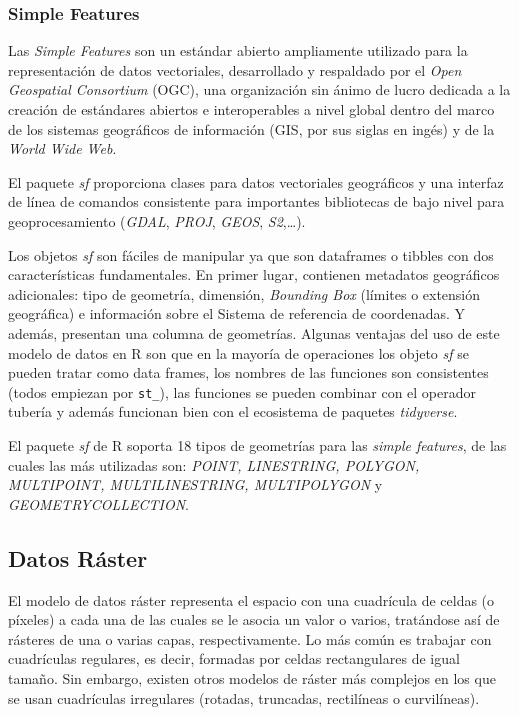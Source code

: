 \documentclass[12pt,a4paper,]{book}
\numberwithin{dummy}{section}
\theoremstyle{ocrenumbox}
\theoremstyle{blacknumex}
\theoremstyle{blacknumbox}
\theoremstyle{ocrenum}
\theoremstyle{ocrenum}
\begin{document}
\hypertarget{simple-features}{%
\subsubsection*{Simple Features}\label{simple-features}}

Las \emph{Simple Features} son un estándar abierto ampliamente utilizado
para la representación de datos vectoriales, desarrollado y respaldado
por el \emph{Open Geospatial Consortium} (OGC), una organización sin
ánimo de lucro dedicada a la creación de estándares abiertos e
interoperables a nivel global dentro del marco de los sistemas
geográficos de información (GIS, por sus siglas en ingés) y de la
\emph{World Wide Web}.

El paquete \emph{sf} proporciona clases para datos vectoriales
geográficos y una interfaz de línea de comandos consistente para
importantes bibliotecas de bajo nivel para geoprocesamiento
(\emph{GDAL}, \emph{PROJ}, \emph{GEOS}, \emph{S2},\ldots).
\citep{sfpackage}

Los objetos \emph{sf} son fáciles de manipular ya que son dataframes o
tibbles con dos características fundamentales. En primer lugar,
contienen metadatos geográficos adicionales: tipo de geometría,
dimensión, \emph{Bounding Box} (límites o extensión geográfica) e
información sobre el Sistema de referencia de coordenadas. Y además,
presentan una columna de geometrías. Algunas ventajas del uso de este
modelo de datos en R son que en la mayoría de operaciones los objeto
\emph{sf} se pueden tratar como data frames, los nombres de las
funciones son consistentes (todos empiezan por \texttt{st\_}), las
funciones se pueden combinar con el operador tubería y además funcionan
bien con el ecosistema de paquetes \emph{tidyverse}.

El paquete \emph{sf} de R soporta 18 tipos de geometrías para las
\emph{simple features}, de las cuales las más utilizadas son:
\emph{POINT, LINESTRING, POLYGON, MULTIPOINT, MULTILINESTRING,
MULTIPOLYGON} y \emph{GEOMETRYCOLLECTION}.

\hypertarget{datos-ruxe1ster}{%
\subsection{Datos Ráster}\label{datos-ruxe1ster}}

El modelo de datos ráster representa el espacio con una cuadrícula de
celdas (o píxeles) a cada una de las cuales se le asocia un valor o
varios, tratándose así de rásteres de una o varias capas,
respectivamente. Lo más común es trabajar con cuadrículas regulares, es
decir, formadas por celdas rectangulares de igual tamaño. Sin embargo,
existen otros modelos de ráster más complejos en los que se usan
cuadrículas irregulares (rotadas, truncadas, rectilíneas o curvilíneas).
\citep{lovelace_geocomputation_2019}
\end{document}
